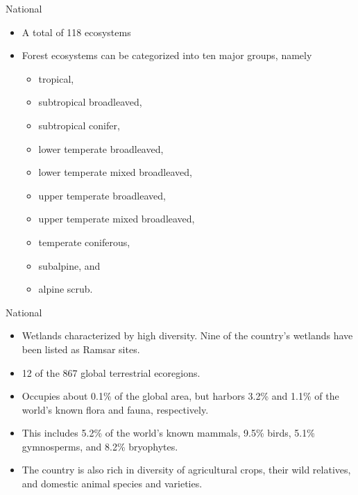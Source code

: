 \documentclass[ignorenonframetext,aspectratio=169]{beamer}
\providecommand{\tightlist}{%
  \setlength{\itemsep}{0pt}\setlength{\parskip}{0pt}}
\begin{document}
\begin{frame}{National}
\protect\hypertarget{national-1}{}

\begin{itemize}
\tightlist
\item
  A total of 118 ecosystems
\item
  Forest ecosystems can be categorized into ten major groups, namely

  \begin{itemize}
  \tightlist
  \item
    tropical,
  \item
    subtropical broadleaved,
  \item
    subtropical conifer,
  \item
    lower temperate broadleaved,
  \item
    lower temperate mixed broadleaved,
  \item
    upper temperate broadleaved,
  \item
    upper temperate mixed broadleaved,
  \item
    temperate coniferous,
  \item
    subalpine, and
  \item
    alpine scrub.
  \end{itemize}
\end{itemize}

\end{frame}

\begin{frame}{National}
\protect\hypertarget{national-2}{}

\begin{itemize}
\tightlist
\item
  Wetlands characterized by high diversity. Nine of the country's
  wetlands have been listed as Ramsar sites.
\item
  12 of the 867 global terrestrial ecoregions.
\item
  Occupies about 0.1\% of the global area, but harbors 3.2\% and 1.1\%
  of the world's known flora and fauna, respectively.
\item
  This includes 5.2\% of the world's known mammals, 9.5\% birds, 5.1\%
  gymnosperms, and 8.2\% bryophytes.
\item
  The country is also rich in diversity of agricultural crops, their
  wild relatives, and domestic animal species and varieties.
\end{itemize}

\end{frame}
\end{document}
